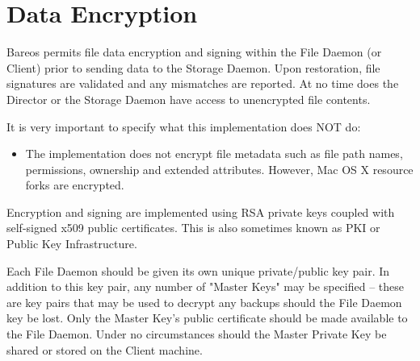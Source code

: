 
\chapter{Data Encryption}
\label{DataEncryption}

Bareos permits file data encryption and signing within the File Daemon (or
Client) prior to sending data to the Storage Daemon.  Upon restoration,
file signatures are validated and any mismatches are reported.  At no time
does the Director or the Storage Daemon have access to unencrypted file
contents.



It is very important to specify what this implementation does NOT
do:
\begin{itemize}

\item The implementation does not encrypt file metadata such as file path
  names, permissions, ownership and extended attributes.
  However, Mac OS X resource forks are encrypted.
\end{itemize}

Encryption and signing are implemented using RSA private keys coupled with
self-signed x509 public certificates. This is also sometimes known as PKI
or Public Key Infrastructure.

Each File Daemon should be given its own unique private/public key pair.
In addition to this key pair, any number of "Master Keys" may be specified
-- these are key pairs that may be used to decrypt any backups should the
File Daemon key be lost.  Only the Master Key's public certificate should
be made available to the File Daemon.  Under no circumstances should the
Master Private Key be shared or stored on the Client machine.

